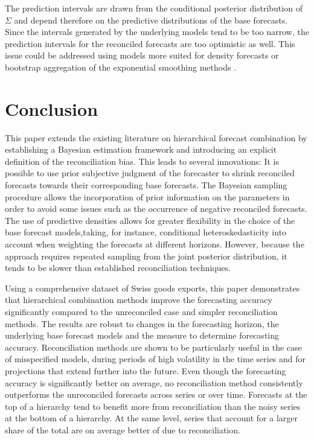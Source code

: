 \documentclass[a4paper,fleqn,11pt]{article}
\begin{document}
The prediction intervals are drawn from the conditional posterior distribution of $\Sigma$ and depend therefore on the predictive distributions of the base forecasts. Since the intervals generated by the underlying models tend to be too narrow, the prediction intervals for the reconciled forecasts are too optimistic as well. This issue could be addressed using models more suited for density forecasts or bootstrap aggregation of the exponential smoothing methods \citep{Bergmeir2016}.\\

\section{Conclusion}\label{sec:conc}
This paper extends the existing literature on hierarchical forecast combination by establishing a Bayesian estimation framework and introducing an explicit definition of the reconciliation bias. This leads to several innovations: It is possible to use prior subjective judgment of the forecaster to shrink reconciled forecasts towards their corresponding base forecasts. The Bayesian sampling procedure allows the incorporation of prior information on the parameters in order to avoid some issues such as the occurrence of negative reconciled forecasts. The use of predictive densities allows for greater flexibility in the choice of the base forecast models,taking, for instance, conditional heteroskedasticity into account when weighting the forecasts at different horizons. However, because the approach requires repeated sampling from the joint posterior distribution, it tends to be slower than established reconciliation techniques.

Using a comprehensive dataset of Swiss goods exports, this paper demonstrates that hierarchical combination methods improve the forecasting accuracy significantly compared to the unreconciled case and simpler reconciliation methods. The results are robust to changes in the forecasting horizon, the underlying base forecast models and the measure to determine forecasting accuracy. Reconciliation methods are shown to be particularly useful in the case of misspecified models, during periods of high volatility in the time series and for projections that extend further into the future. Even though the forecasting accuracy is significantly better on average, no reconciliation method consistently outperforms the unreconciled forecasts across series or over time. Forecasts at the top of a hierarchy tend to benefit more from reconciliation than the noisy series at the bottom of a hierarchy. At the same level, series that account for a larger share of the total are on average better of due to reconciliation.
\end{document}
